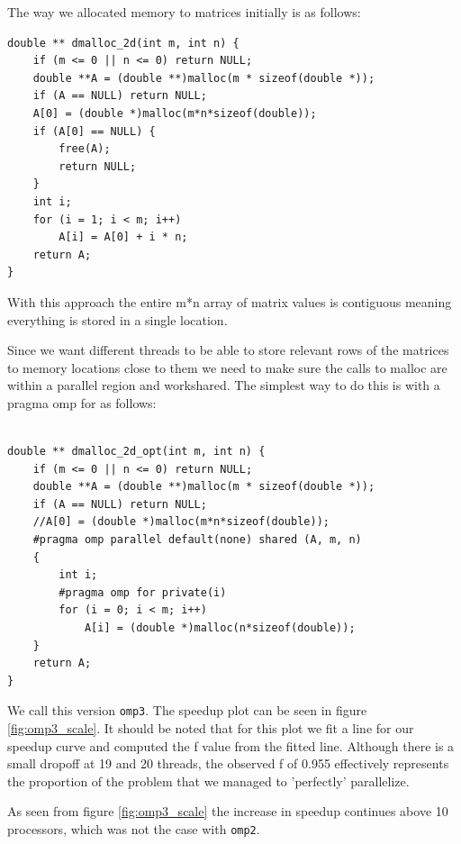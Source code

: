 The way we allocated memory to matrices initially is as follows: 


\begin{lstlisting}[caption = Initial memory allocation]
double ** dmalloc_2d(int m, int n) {
	if (m <= 0 || n <= 0) return NULL;
	double **A = (double **)malloc(m * sizeof(double *));
	if (A == NULL) return NULL;
	A[0] = (double *)malloc(m*n*sizeof(double));
	if (A[0] == NULL) {
		free(A); 
		return NULL; 
	}
	int i;
	for (i = 1; i < m; i++)
		A[i] = A[0] + i * n;
	return A;
}
\end{lstlisting}

With this approach the entire m*n array of matrix values is contiguous meaning everything is stored in a single location.

Since we want different threads to be able to store relevant rows of the matrices to memory locations close to them we need to make sure the calls to malloc are within a parallel region and workshared.
The simplest way to do this is with a pragma omp for as follows:

\begin{lstlisting}[caption = Parallelized memory allocation]

double ** dmalloc_2d_opt(int m, int n) {
	if (m <= 0 || n <= 0) return NULL;
	double **A = (double **)malloc(m * sizeof(double *));
	if (A == NULL) return NULL;
	//A[0] = (double *)malloc(m*n*sizeof(double));	
	#pragma omp parallel default(none) shared (A, m, n)
	{
		int i;
		#pragma omp for	private(i) 
		for (i = 0; i < m; i++)
			A[i] = (double *)malloc(n*sizeof(double));
	}
	return A;
}
\end{lstlisting}


We call this version \texttt{omp3}. The speedup plot can be seen in figure \ref{fig:omp3_scale}. It should be noted that for this plot we fit a line for our speedup curve and computed the f value from the fitted line. Although there is a small dropoff at 19 and 20 threads, the observed f of 0.955 effectively represents the proportion of the problem that we managed to 'perfectly' parallelize.  

As seen from figure \ref{fig:omp3_scale} the increase in speedup continues above 10 processors, which was not the case with \texttt{omp2}.

